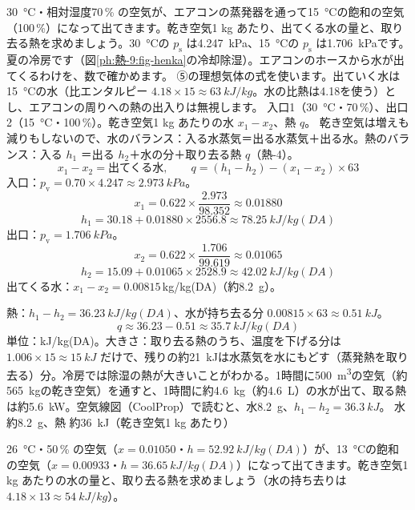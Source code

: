 \begin{phreidai}
\label{ph:熱-9:ex4}\qty{30}{\celsius}・相対湿度70\,\% の空気が、エアコンの蒸発器を通って\qty{15}{\celsius}の飽和の空気（100\,\%）になって出てきます。乾き空気1 kg あたり、出てくる水の量と、取り去る熱を求めましょう。\qty{30}{\celsius}の $p_{\mathrm s}$ は\qty{4.247}{kPa}、\qty{15}{\celsius}の $p_{\mathrm s}$ は\qty{1.706}{kPa}です。
\phbamen
夏の冷房です（図\ref{ph:熱-9:fig-henka}の冷却除湿）。エアコンのホースから水が出てくるわけを、数で確かめます。
\phmushi
⑤の理想気体の式を使います。出ていく水は\qty{15}{\celsius}の水（比エンタルピー $4.18\times15\approx\qty{63}{kJ/kg}$。水の比熱は4.18を使う）とし、エアコンの周りへの熱の出入りは無視します。
\phzu
入口1（\qty{30}{\celsius}・70\,\%）、出口2（\qty{15}{\celsius}・100\,\%）。乾き空気1 kg あたりの水 $x_1-x_2$、熱 $q$。
\phriyu
乾き空気は増えも減りもしないので、水のバランス：入る水蒸気＝出る水蒸気＋出る水。熱のバランス：入る $h_1$ ＝出る $h_2$＋水の分＋取り去る熱 $q$（熱-4）。
\phtateru
\[ x_1-x_2=\text{出てくる水},\qquad q=(h_1-h_2)-(x_1-x_2)\times63 \]
\phtoku
入口：$p_{\mathrm v}=0.70\times4.247\approx\qty{2.973}{kPa}$。
\[ x_1=0.622\times\frac{2.973}{98.352}\approx0.01880 \]
\[ h_1=30.18+0.01880\times2556.8\approx\qty{78.25}{kJ/kg(DA)} \]
出口：$p_{\mathrm v}=\qty{1.706}{kPa}$。
\[ x_2=0.622\times\frac{1.706}{99.619}\approx0.01065 \]
\[ h_2=15.09+0.01065\times2528.9\approx\qty{42.02}{kJ/kg(DA)} \]
出てくる水：$x_1-x_2=0.00815$\,kg/kg(DA)（約\qty{8.2}{g}）。

熱：$h_1-h_2=\qty{36.23}{kJ/kg(DA)}$、水が持ち去る分 $0.00815\times63\approx\qty{0.51}{kJ}$。
\[ q\approx36.23-0.51\approx\qty{35.7}{kJ/kg(DA)} \]
\phtashikame
単位：kJ/kg(DA)。大きさ：取り去る熱のうち、温度を下げる分は $1.006\times15\approx\qty{15}{kJ}$ だけで、残りの約\qty{21}{kJ}は水蒸気を水にもどす（蒸発熱を取り去る）分。冷房では除湿の熱が大きいことがわかる。1時間に\qty{500}{m^3}の空気（約\qty{565}{kg}の乾き空気）を通すと、1時間に約\qty{4.6}{kg}（約\qty{4.6}{L}）の水が出て、取る熱は約\qty{5.6}{kW}。空気線図（CoolProp）で読むと、水\qty{8.2}{g}、$h_1-h_2=\qty{36.3}{kJ}$。
\kotae 水 約\qty{8.2}{g}、熱 約\qty{36}{kJ}（乾き空気1 kg あたり）
\end{phreidai}
\begin{jibun}
\qty{26}{\celsius}・50\,\% の空気（$x=0.01050$・$h=\qty{52.92}{kJ/kg(DA)}$）が、\qty{13}{\celsius}の飽和の空気（$x=0.00933$・$h=\qty{36.65}{kJ/kg(DA)}$）になって出てきます。乾き空気1 kg あたりの水の量と、取り去る熱を求めましょう（水の持ち去りは $4.18\times13\approx\qty{54}{kJ/kg}$）。
\end{jibun}

